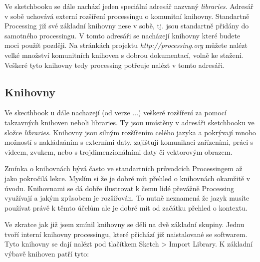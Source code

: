 \documentclass[11pt]{article}
\begin{document}
Ve sketchbooku se dále nachází jeden speciální adresář nazvaný {\em libraries}. Adresář v sobě uchovává externí rozšíření processingu o komunitní knihovny. Standartně Processing již své základní knihovny nese v sobě, tj. jsou standartně přidány do samotného processingu. V tomto adresáři se nacházejí knihovny které budete moci použít později. Na stránkách projektu {\em http://processing.org} můžete nalézt velké množství komunitních knihoven s dobrou dokumentací, volně ke stažení. Veškeré tyto knihovny tedy processing potřeuje nalézt v tomto adresáři.

\subsection{Knihovny}

Ve skecthbook u dále nachazejí (od verze ...) veškeré rozšíření za pomocí takzavných knihoven neboli libraries. Ty jsou umístěny v adresáři sketchbooku ve složce {\em libraries}. Knihovny jsou silným rozšířením celého jazyka a pokrývají mnoho možností s nakládaáním s externími daty, zajištují komunikaci zařízeními, práci s videem, zvukem, nebo s trojdimenzionálními daty či vektorovým obrazem.

Zmínka o knihovnách bývá často ve standartních průvodcích Processingem až jako pokročilá lekce. Myslím si že je dobré mít přehled o knihovnách okamžitě v úvodu. Knihovnami se dá dobře ilustrovat k čemu lidé převážně Processing využívají a jakým způsobem je rozšiřován. To nutně neznamená že jazyk musíte používat právě k těmto účelům ale je dobré mít od začátku přehled o kontextu.

Ve zkratce jak již jsem zmínil knihovny se dělí na dvě základní skupiny. Jednu tvoří interní knihovny processingu, které přichází již naistalované se softwarem. Tyto knihovny se dají nalézt pod tlačítkem Sketch > Import Library.
K základní výbavě knihoven patří tyto:
\end{document}
